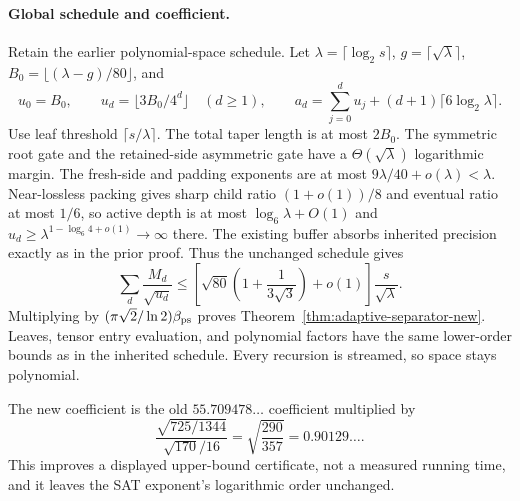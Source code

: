 \paragraph{Global schedule and coefficient.}
Retain the earlier polynomial-space schedule. Let
$\lambda=\lceil\log_2s\rceil$, $g=\lceil\sqrt\lambda\rceil$,
$B_0=\lfloor(\lambda-g)/80\rfloor$, and
\[
 u_0=B_0,\qquad u_d=\lfloor3B_0/4^d\rfloor\quad(d\ge1),\qquad
 a_d=\sum_{j=0}^d u_j+(d+1)\lceil6\log_2\lambda\rceil.
\]
Use leaf threshold $\lceil s/\lambda\rceil$. The total taper length is
at most $2B_0$. The symmetric root gate and the retained-side asymmetric
gate have a $\Theta(\sqrt\lambda)$ logarithmic margin. The fresh-side
and padding exponents are at most $9\lambda/40+o(\lambda)<\lambda$.
Near-lossless packing gives sharp child ratio $(1+o(1))/8$ and eventual
ratio at most $1/6$, so active depth is at most $\log_6\lambda+O(1)$
and $u_d\ge\lambda^{1-\log_6 4+o(1)}\to\infty$ there. The existing
buffer absorbs inherited precision exactly as in the prior proof.
Thus the unchanged schedule gives
\[
 \sum_d\frac{M_d}{\sqrt{u_d}}
 \le\left[\sqrt{80}\left(1+\frac1{3\sqrt3}\right)+o(1)\right]
 \frac{s}{\sqrt\lambda}.
\]
Multiplying by $(\pi\sqrt2/\ln2)\beta_{\rm ps}$ proves
Theorem~\ref{thm:adaptive-separator-new}. Leaves, tensor entry evaluation,
and polynomial factors have the same lower-order bounds as in the
inherited schedule. Every recursion is streamed, so space stays polynomial.

The new coefficient is the old $55.709478\ldots$ coefficient multiplied by
\[
 \frac{\sqrt{725/1344}}{\sqrt{170}/16}
 =\sqrt{\frac{290}{357}}=0.90129\ldots.
\]
This improves a displayed upper-bound certificate, not a measured running
time, and it leaves the SAT exponent's logarithmic order unchanged.
